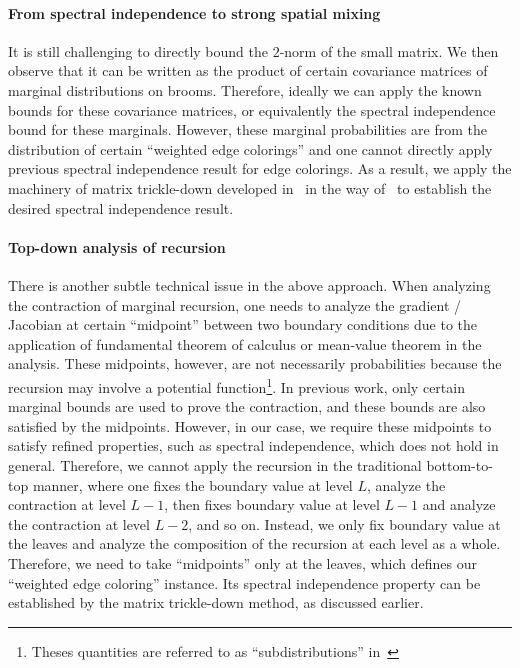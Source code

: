 \paragraph{From spectral independence to strong spatial mixing}

It is still challenging to directly bound the $2$-norm of the small matrix. We then observe that it can be written as the product of certain covariance matrices of marginal distributions on brooms. Therefore, ideally we can apply the known bounds for these covariance matrices, or equivalently the spectral independence bound for these marginals. However, these marginal probabilities are from the distribution of certain ``weighted edge colorings'' and one cannot directly apply previous spectral independence result for edge colorings. As a result, we apply the machinery of matrix trickle-down developed in~\cite{ALOG21} in the way of~\cite{WZZ24} to establish the desired spectral independence result. 

\paragraph{Top-down analysis of recursion}

There is another subtle technical issue in the above approach. When analyzing the contraction of marginal recursion, one needs to analyze the gradient / Jacobian at certain ``midpoint'' between two boundary conditions due to the application of fundamental theorem of calculus or mean-value theorem in the analysis. These midpoints, however, are not necessarily probabilities because the recursion may involve a potential function\footnote{Theses quantities are referred to as ``subdistributions'' in~\cite{CLMM23}}. In previous work, only certain marginal bounds are used to prove the contraction, and these bounds are also satisfied by the midpoints. However, in our case, we require these midpoints to satisfy refined properties, such as spectral independence, which does not hold in general. Therefore, we cannot apply the recursion in the traditional bottom-to-top manner, where one fixes the boundary value at level $L$, analyze the contraction at level $L-1$, then fixes boundary value at level $L-1$ and analyze the contraction at level $L-2$, and so on. Instead, we only fix boundary value at the leaves and analyze the composition of the recursion at each level as a whole. Therefore, we need to take ``midpoints'' only at the leaves, which defines our ``weighted edge coloring'' instance. Its spectral independence property can be established by the matrix trickle-down method, as discussed earlier.


